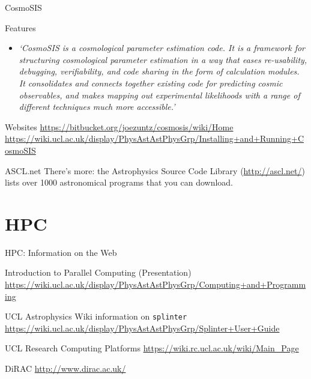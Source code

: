 \documentclass{beamer}
\begin{document}
\begin{frame}{CosmoSIS}
  \begin{block}{Features}
    \begin{itemize}
      \item \textit{`CosmoSIS is a cosmological parameter estimation code. It is a framework for structuring cosmological parameter estimation in a way that eases re-usability, debugging, verifiability, and code sharing in the form of calculation modules. It consolidates and connects together existing code for predicting cosmic observables, and makes mapping out experimental likelihoods with a range of different techniques much more accessible.'}
    \end{itemize}
  \end{block}
  \begin{block}{Websites}
    \url{https://bitbucket.org/joezuntz/cosmosis/wiki/Home}
    \url{https://wiki.ucl.ac.uk/display/PhysAstAstPhysGrp/Installing+and+Running+CosmoSIS}
  \end{block}

\end{frame}

\begin{frame}{ASCL.net}
There's more: the Astrophysics Source Code Library (\url{http://ascl.net/}) lists over 1000 astronomical programs that you can download.
\end{frame}


\section{HPC}

\begin{frame}{HPC: Information on the Web}

    \begin{block}{Introduction to Parallel Computing (Presentation)}
    \url{https://wiki.ucl.ac.uk/display/PhysAstAstPhysGrp/Computing+and+Programming}
  \end{block}

    \begin{block}{UCL Astrophysics Wiki information on \texttt{splinter}}
    \url{https://wiki.ucl.ac.uk/display/PhysAstAstPhysGrp/Splinter+User+Guide}
  \end{block}

  \begin{block}{UCL Research Computing Platforms}
    \url{https://wiki.rc.ucl.ac.uk/wiki/Main_Page}
  \end{block}

  \begin{block}{DiRAC}
    \url{http://www.dirac.ac.uk/}
  \end{block}

\end{frame}
\end{document}
